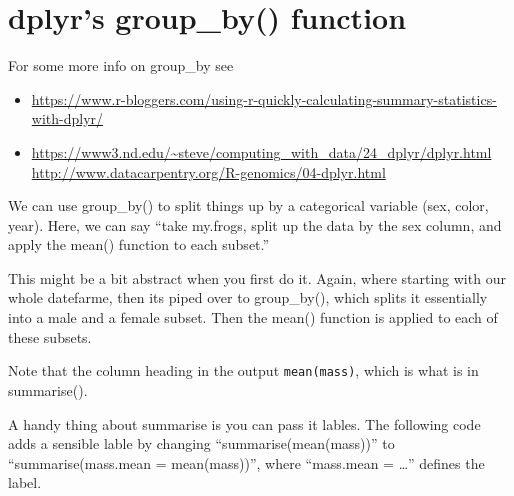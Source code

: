 \documentclass[]{book}
\newenvironment{Shaded}{\begin{snugshade}}{\end{snugshade}}
\newcommand{\KeywordTok}[1]{\textcolor[rgb]{0.13,0.29,0.53}{\textbf{#1}}}
\newcommand{\DataTypeTok}[1]{\textcolor[rgb]{0.13,0.29,0.53}{#1}}
\newcommand{\StringTok}[1]{\textcolor[rgb]{0.31,0.60,0.02}{#1}}
\newcommand{\CommentTok}[1]{\textcolor[rgb]{0.56,0.35,0.01}{\textit{#1}}}
\newcommand{\OperatorTok}[1]{\textcolor[rgb]{0.81,0.36,0.00}{\textbf{#1}}}
\newcommand{\NormalTok}[1]{#1}
\providecommand{\tightlist}{%
  \setlength{\itemsep}{0pt}\setlength{\parskip}{0pt}}
\theoremstyle{definition}
\theoremstyle{definition}
\theoremstyle{definition}
\theoremstyle{remark}
\begin{document}
\section{dplyr's group\_by() function}\label{dplyrs-group_by-function}

For some more info on group\_by see

\begin{itemize}
\tightlist
\item
  \url{https://www.r-bloggers.com/using-r-quickly-calculating-summary-statistics-with-dplyr/}
\item
  \url{https://www3.nd.edu/~steve/computing_with_data/24_dplyr/dplyr.html}
  \url{http://www.datacarpentry.org/R-genomics/04-dplyr.html}
\end{itemize}

We can use group\_by() to split things up by a categorical variable
(sex, color, year). Here, we can say ``take my.frogs, split up the data
by the sex column, and apply the mean() function to each subset.''

\begin{Shaded}
\end{Shaded}

This might be a bit abstract when you first do it. Again, where starting
with our whole datefarme, then its piped over to group\_by(), which
splits it essentially into a male and a female subset. Then the mean()
function is applied to each of these subsets.

Note that the column heading in the output \texttt{mean(mass)}, which is
what is in summarise().

A handy thing about summarise is you can pass it lables. The following
code adds a sensible lable by changing ``summarise(mean(mass))'' to
``summarise(mass.mean = mean(mass))'', where ``mass.mean = \ldots{}''
defines the label.

\begin{Shaded}
\end{Shaded}
\end{document}
